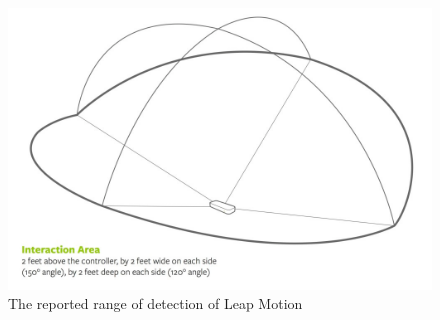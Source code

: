\documentclass[11pt]{report}
\begin{document}
\begin{center}
	\begin{figure}[H]
		\begin{center}
			\includegraphics[scale=0.33]{pics/leapmotioninteractionarea}
			\caption{The reported range of detection of Leap Motion}
			\label{leapmotioninteractionarea}
		\end{center}
	\end{figure}
\end{center}
\end{document}
